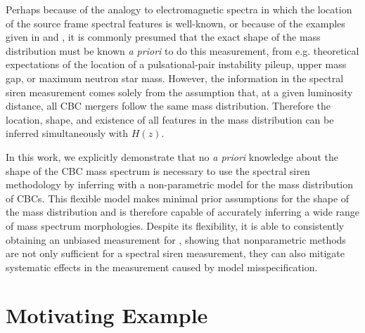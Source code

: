 \documentclass[]{aastex631}
\begin{document}
Perhaps because of the analogy to electromagnetic spectra in which the location of the source frame spectral features is well-known, or because of the examples given in \cite{farr_future_2019} and \cite{chernoff+fin}, it is commonly presumed that the exact shape of the mass distribution must be known \emph{a priori} to do this measurement, from e.g. theoretical expectations of the location of a pulsational-pair instability pileup, upper mass gap, or maximum neutron star mass.
However, the information in the spectral siren measurement comes solely from the assumption that, at a given luminosity distance, all CBC mergers follow the same mass distribution.
Therefore the location, shape, and existence of all features in the mass distribution can be inferred simultaneously with $H(z)$.

In this work, we explicitly demonstrate that no \emph{a priori} knowledge about the shape of the CBC mass spectrum is necessary to use the spectral siren methodology by inferring \Ho with a non-parametric model for the mass distribution of CBCs. 
This flexible model makes minimal prior assumptions for the shape of the mass distribution and is therefore capable of accurately inferring a wide range of mass spectrum morphologies.
Despite its flexibility, it is able to consistently obtaining an unbiased measurement for \Ho, showing that nonparametric methods are not only sufficient for a spectral siren measurement, they can also mitigate systematic effects in the measurement caused by model misspecification.


\section{Motivating Example}
\end{document}
